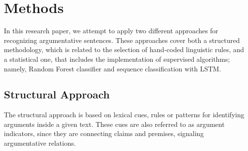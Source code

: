 \chapter{Methods}

\label{Chapter3}

In this research paper, we attempt to apply two different approaches for recognizing argumentative sentences. These approaches cover both a structured methodology, which is related to the selection of hand-coded linguistic rules, and a statistical one, that includes the implementation of supervised algorithms; namely, Random Forest classifier and sequence classification with LSTM. \par

\section{Structural Approach}

The structural approach is based on lexical cues, rules or patterns for identifying arguments inside a given text. These cues are also referred to as argument indicators, since they are connecting claims and premises, signaling argumentative relations. \par


